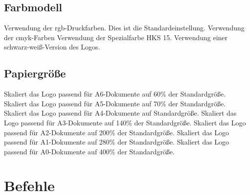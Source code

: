 \subsection{Farbmodell}\label{options:color}

\begin{description}
  \classoptionitem[rgb]
    Verwendung der rgb-Druckfarben. Dies ist die Standardeinstellung.
  \classoptionitem[cmyk]
    Verwendung der cmyk-Farben
  \classoptionitem[hks]
    Verwendung der Spezialfarbe HKS 15.
  \classoptionitem[mono]
    Verwendung einer schwarz-weiß-Version des Logos.
\end{description}

\subsection{Papiergröße}\label{options:papersize}

\begin{description}
  \classoptionitem[a6paper]
    Skaliert das Logo passend für A6-Dokumente auf 60\% der Standardgröße.
  \classoptionitem[a5paper]
    Skaliert das Logo passend für A5-Dokumente auf 70\% der Standardgröße.
  \classoptionitem[a4paper]
    Skaliert das Logo passend für A4-Dokumente auf Standardgröße.
  \classoptionitem[a3paper]
    Skaliert das Logo passend für A3-Dokumente auf 140\% der Standardgröße.
  \classoptionitem[a2paper]
    Skaliert das Logo passend für A2-Dokumente auf 200\% der Standardgröße.
  \classoptionitem[a1paper]
    Skaliert das Logo passend für A1-Dokumente auf 280\% der Standardgröße.
  \classoptionitem[a0paper]
    Skaliert das Logo passend für A0-Dokumente auf 400\% der Standardgröße.
\end{description}


\clearpage
\section{Befehle}

